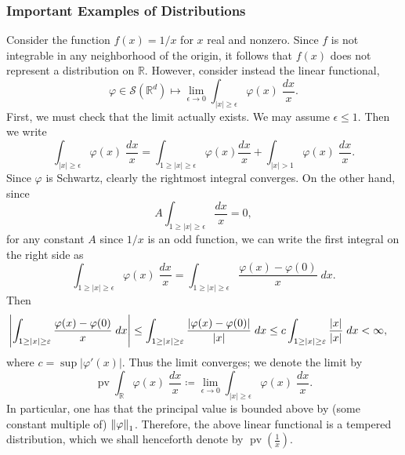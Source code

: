 \documentclass{article}
\begin{document}
\subsubsection{Important Examples of Distributions} 
\begin{example}
	Consider the function $f(x)= 1/x$ for $x$ real and nonzero. Since $f$ is not integrable in any neighborhood of the origin, it follows that $f(x)$ does not represent a distribution on $\mathbb{R}$. However, consider instead the linear functional, 
	\begin{equation*}
		\varphi \in \mathcal{S}(\mathbb{R}^{d}) \mapsto \lim_{\epsilon \to 0}\int_{|x|\geq \epsilon}\varphi(x)\;\frac{dx}{x}. 
	\end{equation*} 
	First, we must check that the limit actually exists. We may assume $\epsilon \leq 1$. Then we write 
	\begin{equation*}
		\int_{|x|\geq \epsilon}\varphi(x)\;\frac{dx}{x} = \int_{1 \geq |x| \geq \epsilon} \varphi(x)\frac{dx}{x} + \int_{|x| > 1}\varphi(x)\;\frac{dx}{x}. 
	\end{equation*} 
	Since $\varphi$ is Schwartz, clearly the rightmost integral converges. On the other hand, since 
	\begin{equation*}
		A\int_{1 \geq |x| \geq \epsilon}\frac{dx}{x} = 0, 
	\end{equation*} 
	for any constant $A$ since $1/x$ is an odd function, we can write the first integral on the right side as 
	\begin{equation*}
		\int_{1\geq |x| \geq \epsilon}\varphi(x)\;\frac{dx}{x}= \int_{1 \geq |x|\geq \epsilon}\frac{\varphi(x) - \varphi(0)}{x}\;dx. 
	\end{equation*} 
	Then 
	\begin{align*}
		\begin{split} 
			\left| \int_{1 \geq |x| \geq \varepsilon}\frac{\varphi(x) - \varphi(0)}{x}\;dx \right| &\leq \int_{1 \geq |x| \geq \varepsilon}\frac{|\varphi(x) -\varphi(0)|}{|x|}\;dx \leq c\int_{1\geq |x| \geq \varepsilon} \frac{|x|}{|x|}\;dx < \infty, 
		\end{split} 
	\end{align*}
	where $c = \sup|\varphi'(x)|$. Thus the limit converges; we denote the limit by 
	\begin{equation*}
		\operatorname{pv}{\int_{\mathbb{R}}\varphi(x)\;\frac{dx}{x}} \coloneqq \lim_{\epsilon \to 0}\int_{|x|\geq \epsilon}\varphi(x)\;\frac{dx}{x}. 
	\end{equation*} 
	In particular, one has that the principal value is bounded above by (some constant multiple of) $\left\Vert \varphi \right\Vert_{1}$. Therefore, the above linear functional is a tempered distribution, which we shall henceforth denote by $\operatorname{pv}\left(\frac{1}{x}\right)$. 
\end{example} 
\end{document}
